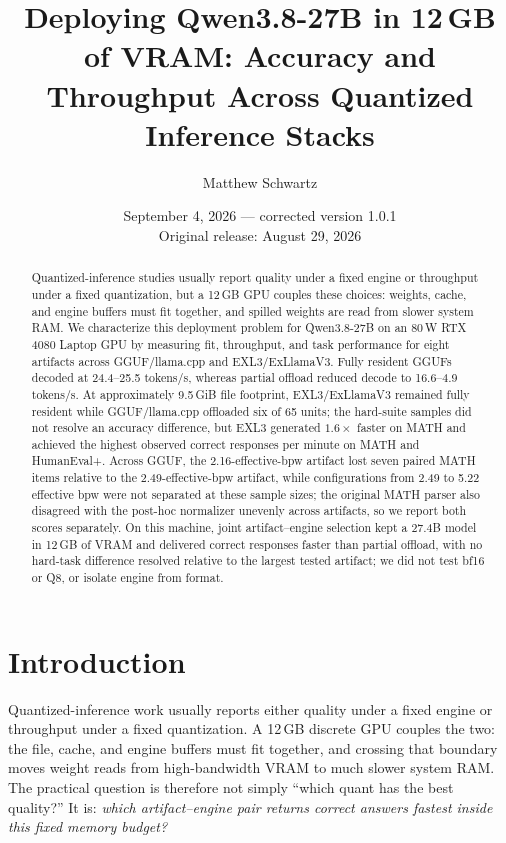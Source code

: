 \documentclass[11pt]{article}
\title{\textbf{Deploying Qwen3.8-27B in 12\,GB of VRAM: Accuracy and
Throughput Across Quantized Inference Stacks}}
\author{Matthew Schwartz\singleauthorinfo{Independent researcher \enspace
\href{https://orcid.org/0009-0009-4171-7247}{ORCID 0009-0009-4171-7247}
\enspace \texttt{matthew.schwartz.research@gmail.com}}}
\date{September 4, 2026 --- corrected version 1.0.1\\
\small Original release: August 29, 2026}
\begin{document}
\maketitle

\begin{abstract}
\noindent
Quantized-inference studies usually report quality under a fixed engine or
throughput under a fixed quantization, but a 12\,GB GPU couples these choices:
weights, cache, and engine buffers must fit together, and spilled weights are
read from slower system RAM. We characterize this deployment problem for
Qwen3.8-27B on an 80\,W RTX 4080 Laptop GPU by measuring fit, throughput, and
task performance for eight artifacts across GGUF/llama.cpp and
EXL3/ExLlamaV3. Fully resident GGUFs decoded at 24.4--25.5 tokens/s, whereas
partial offload reduced decode to 16.6--4.9 tokens/s. At approximately
9.5\,GiB file footprint, EXL3/ExLlamaV3 remained fully resident while
GGUF/llama.cpp offloaded six of 65 units; the hard-suite samples did not
resolve an accuracy difference, but EXL3 generated $1.6\times$ faster on MATH
and achieved the highest observed correct responses per minute on MATH and
HumanEval+. Across GGUF, the 2.16-effective-bpw artifact lost seven paired
MATH items relative to the 2.49-effective-bpw artifact, while configurations
from 2.49 to 5.22 effective bpw were not separated at these sample sizes; the
original MATH parser also disagreed with the post-hoc normalizer unevenly
across artifacts, so we report both scores separately. On this machine, joint
artifact--engine selection kept a 27.4B model in 12\,GB of VRAM and delivered
correct responses faster than partial offload, with no hard-task difference
resolved relative to the largest tested artifact; we did not test bf16 or Q8,
or isolate engine from format.
\end{abstract}



\section{Introduction}
\label{sec:intro}

Quantized-inference work usually reports either quality under a fixed engine or
throughput under a fixed quantization. A 12\,GB discrete GPU couples the two:
the file, cache, and engine buffers must fit together, and crossing that boundary
moves weight reads from high-bandwidth VRAM to much slower system RAM. The
practical question is therefore not simply ``which quant has the best quality?''
It is: \emph{which artifact--engine pair returns correct answers fastest inside
this fixed memory budget?}
\end{document}
